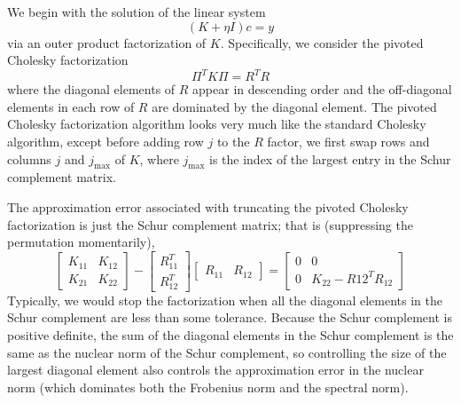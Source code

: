 \documentclass[12pt, leqno]{article} %
\begin{document}
We begin with the solution of the linear system
\[
  (K + \eta I) c = y
\]
via an outer product factorization of $K$.  Specifically, we consider
the pivoted Cholesky factorization
\[
  \Pi^T K \Pi = R^T R
\]
where the diagonal elements of $R$ appear in descending order and
the off-diagonal elements in each row of $R$ are dominated by the
diagonal element.  The pivoted Cholesky factorization algorithm looks
very much like the standard Cholesky algorithm, except before adding
row $j$ to the $R$ factor, we first swap rows and columns $j$ and
$j_{\max}$ of $K$, where $j_{\max}$ is the index of the largest entry
in the Schur complement matrix.

The approximation error associated with truncating the pivoted
Cholesky factorization is just the Schur complement matrix;
that is (suppressing the permutation momentarily),
\[
  \begin{bmatrix} K_{11} & K_{12} \\ K_{21} & K_{22} \end{bmatrix} -
  \begin{bmatrix} R_{11}^T \\ R_{12}^T \end{bmatrix}
  \begin{bmatrix} R_{11} & R_{12} \end{bmatrix} =
  \begin{bmatrix} 0 & 0 \\ 0 & K_{22} - R{12}^T R_{12} \end{bmatrix}
\]
Typically, we would stop the
factorization when all the diagonal elements in the Schur
complement are less than some tolerance.  Because the Schur complement
is positive definite, the sum of the diagonal elements in the Schur
complement is the same as the nuclear norm of the Schur complement,
so controlling the size of the largest diagonal element also controls
the approximation error in the nuclear norm (which dominates both the
Frobenius norm and the spectral norm).
\end{document}
